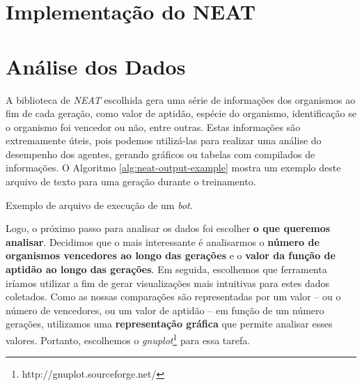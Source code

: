 \section{\label{section:neat-details}Implementação do NEAT}


\section{\label{section:analytics}Análise dos Dados}

A biblioteca de \textit{NEAT} escolhida gera uma série de informações dos
organismos ao fim de cada geração, como valor de aptidão, espécie do organismo,
identificação se o organismo foi vencedor ou não, entre outras. Estas
informações são extremamente úteis, pois podemos utilizá-las para realizar uma
análise do desempenho dos agentes, gerando gráficos ou tabelas com compilados de
informações. O Algoritmo \ref{alg:neat-output-example} mostra um exemplo deste
arquivo de texto para uma geração durante o treinamento.

\begin{algorithm}[H]

\caption[Exemplo de arquivo de execução de um \textit{bot}.]
{\label{alg:neat-output-example}Exemplo de arquivo de execução de um
    \textit{bot}.}
\end{algorithm}

Logo, o próximo passo para analisar os dados foi escolher \textbf{o que queremos
analisar}. Decidimos que o mais interessante é analisarmos o \textbf{número de
organismos vencedores ao longo das gerações} e o \textbf{valor da função de
aptidão ao longo das gerações}. Em seguida, escolhemos que ferramenta iríamos
utilizar a fim de gerar visualizações mais intuitivas para estes dados
coletados. Como as nossas comparações são representadas por um valor -- ou o
número de vencedores, ou um valor de aptidão -- em função de um número gerações,
utilizamos uma \textbf{representação gráfica} que permite analisar esses
valores. Portanto, escolhemos o
\textit{gnuplot}\footnote{http://gnuplot.sourceforge.net/} para essa tarefa.

